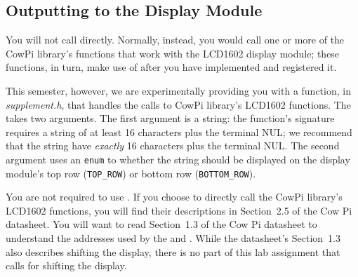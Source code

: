 %
%


\subsection{Outputting to the Display Module}

You will not call  directly.
Normally, instead, you would call one or more of the CowPi library's functions that work with the LCD1602 display module;
these functions, in turn, make use of  after you have implemented and registered it.

This semester, however, we are experimentally providing you with a function,  in \textit{supplement.h}, that handles the calls to CowPi library's LCD1602 functions.
The  takes two arguments.
The first argument is a string:
the function's signature requires a string of at least 16 characters plus the terminal NUL;
we recommend that the string have \textit{exactly} 16 characters plus the terminal NUL\@.
The second argument uses an \lstinline{enum} to whether the string should be displayed on the display module's top row (\lstinline{TOP_ROW}) or bottom row (\lstinline{BOTTOM_ROW}).

You are not required to use .
If you choose to directly call the CowPi library's LCD1602 functions, you will find their descriptions in Section~2.5 of the Cow Pi datasheet.
You will want to read Section~1.3 of the Cow Pi datasheet to understand the addresses used by the  and .
While the datasheet's Section~1.3 also describes shifting the display, there is no part of this lab assignment that calls for shifting the display.

